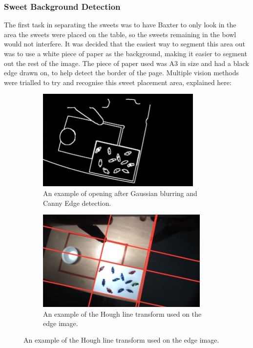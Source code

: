\subsubsection{Sweet Background Detection}
The first task in separating the sweets was to have Baxter to only look in the area the sweets were placed on the table, so the sweets remaining in the bowl would not interfere. It was decided that the easiest way to segment this area out was to use a white piece of paper as the background, making it easier to segment out the rest of the image. The piece of paper used was A3 in size and had a black edge drawn on, to help detect the border of the page. Multiple vision methods were trialled to try and recognise this sweet placement area, explained here:
\begin{figure}[H]
    \captionsetup[subfigure]{justification=centering}
    \begin{subfigure}[H]{0.475\textwidth}   
        \centering 
        \includegraphics[width=\textwidth, height=5cm]{cannedge.jpg}
        \caption{An example of opening after Gaussian blurring and Canny Edge detection.}
        \label{fig:TimeGrasp}
    \end{subfigure}
    \begin{subfigure}[H]{0.475\textwidth}   
        \centering 
        \includegraphics[width=\textwidth, height=5cm]{houghline.png}
        \caption{An example of the Hough line transform used on the edge image.}
        \label{fig:TimeGrasp}
    \end{subfigure}
\end{figure}
